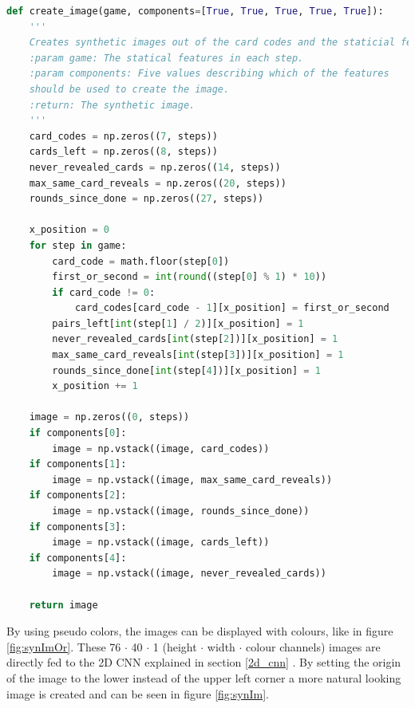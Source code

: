 \begin{lstlisting}[language=python, caption=Code for creating a synthetic image from the card codes and the statistical features., xleftmargin=5.0ex]
def create_image(game, components=[True, True, True, True, True]):
	'''
	Creates synthetic images out of the card codes and the staticial features.
	:param game: The statical features in each step. 
	:param components: Five values describing which of the features 
	should be used to create the image. 
	:return: The synthetic image.
	'''
	card_codes = np.zeros((7, steps))
	cards_left = np.zeros((8, steps))
	never_revealed_cards = np.zeros((14, steps))
	max_same_card_reveals = np.zeros((20, steps))
	rounds_since_done = np.zeros((27, steps))
	
	x_position = 0
	for step in game:
		card_code = math.floor(step[0])
		first_or_second = int(round((step[0] % 1) * 10))
		if card_code != 0:
			card_codes[card_code - 1][x_position] = first_or_second 
		pairs_left[int(step[1] / 2)][x_position] = 1
		never_revealed_cards[int(step[2])][x_position] = 1
		max_same_card_reveals[int(step[3])][x_position] = 1
		rounds_since_done[int(step[4])][x_position] = 1
		x_position += 1
	
	image = np.zeros((0, steps))
	if components[0]:   
		image = np.vstack((image, card_codes))
	if components[1]:
		image = np.vstack((image, max_same_card_reveals))
	if components[2]:  
		image = np.vstack((image, rounds_since_done))
	if components[3]:
		image = np.vstack((image, cards_left))
	if components[4]:   
		image = np.vstack((image, never_revealed_cards))
	
	return image
\end{lstlisting}

\newpage

By using pseudo colors, the images can be displayed with colours, like in figure \ref{fig:synImOr}. These 76 $\cdot$ 40 $\cdot$ 1 (height $\cdot$ width $\cdot$ colour channels) images are directly fed to the 2D CNN explained in section \ref{2d_cnn} . By setting the origin of the image to the lower instead of the upper left corner a more natural looking image is created and can be seen in figure \ref{fig:synIm}. 

